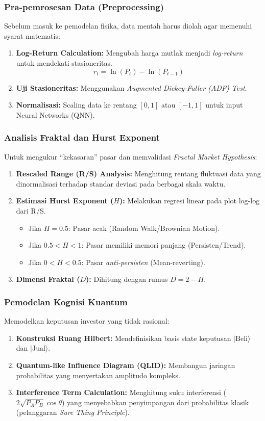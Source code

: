 \subsubsection{Pra-pemrosesan Data (Preprocessing)}
Sebelum masuk ke pemodelan fisika, data mentah harus diolah agar memenuhi syarat matematis:
\begin{enumerate}
    \item \textbf{Log-Return Calculation:} Mengubah harga mutlak menjadi \textit{log-return} untuk mendekati stasioneritas.
    \[ r_t = \ln(P_t) - \ln(P_{t-1}) \]
    \item \textbf{Uji Stasioneritas:} Menggunakan \textit{Augmented Dickey-Fuller (ADF) Test}.
    \item \textbf{Normalisasi:} Scaling data ke rentang $[0,1]$ atau $[-1,1]$ untuk input Neural Networks (QNN).
\end{enumerate}

\subsubsection{Analisis Fraktal dan Hurst Exponent}
Untuk mengukur ``kekasaran'' pasar dan memvalidasi \textit{Fractal Market Hypothesis}:
\begin{enumerate}
    \item \textbf{Rescaled Range (R/S) Analysis:} Menghitung rentang fluktuasi data yang dinormalisasi terhadap standar deviasi pada berbagai skala waktu.
    \item \textbf{Estimasi Hurst Exponent ($H$):} Melakukan regresi linear pada plot log-log dari R/S.
    \begin{itemize}
        \item Jika $H = 0.5$: Pasar acak (Random Walk/Brownian Motion).
        \item Jika $0.5 < H < 1$: Pasar memiliki memori panjang (Persisten/Trend).
        \item Jika $0 < H < 0.5$: Pasar \textit{anti-persisten} (Mean-reverting).
    \end{itemize}
    \item \textbf{Dimensi Fraktal ($D$):} Dihitung dengan rumus $D = 2 - H$.
\end{enumerate}

\subsubsection{Pemodelan Kognisi Kuantum}
Memodelkan keputusan investor yang tidak rasional:
\begin{enumerate}
    \item \textbf{Konstruksi Ruang Hilbert:} Mendefinisikan basis state keputusan $|\text{Beli}\rangle$ dan $|\text{Jual}\rangle$.
    \item \textbf{Quantum-like Influence Diagram (QLID):} Membangun jaringan probabilitas yang menyertakan amplitudo kompleks.
    \item \textbf{Interference Term Calculation:} Menghitung suku interferensi ($2\sqrt{P_A P_B} \cos \theta$) yang menyebabkan penyimpangan dari probabilitas klasik (pelanggaran \textit{Sure Thing Principle}).
\end{enumerate}

